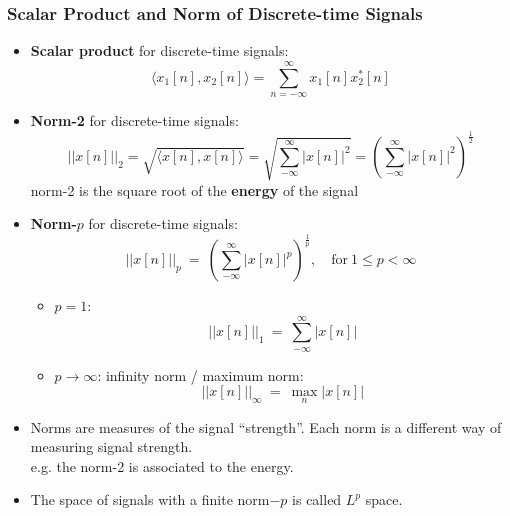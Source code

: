\documentclass[12pt,a4paper]{article}
\begin{document}
 \subsubsection{Scalar Product and Norm of Discrete-time Signals}
 \begin{itemize}
 \item \textbf{Scalar product} for discrete-time signals:
  \[ \langle x_{1}[n], x_{2}[n] \rangle = \sum_{n=-\infty}^{\infty} x_{1}[n] x_{2}^{*}[n] \]
 \item \textbf{Norm-2} for discrete-time signals:
  \[ \lvert \lvert x[n] \rvert \rvert_{2} = \sqrt{\langle x[n], x[n] \rangle} = \sqrt{\sum_{-\infty}^{\infty}\lvert
  x[n] \rvert^{2}} = \left( \sum_{-\infty}^{\infty} \lvert x[n] \rvert^{2} \right) ^{\frac{1}{2}} \]
  norm-2 is the square root of the \textbf{energy} of the signal
 \item \textbf{Norm-$p$} for discrete-time signals:
   \[ \lvert \lvert x[n] \rvert \rvert_{p} \ = \  \left( \sum_{-\infty}^{\infty} \lvert x[n] \rvert^{p} \right)
    ^{\frac{1}{p}}, \quad \text{for} \ 1 \leq p < \infty \]
    \begin{itemize}
     \item $p=1$: \[ \lvert \lvert x[n] \rvert \rvert_{1} \ = \ \sum_{-\infty}^{\infty} \lvert x[n] \rvert \]
     \item $p \to \infty$: infinity norm / maximum norm:\[ \lvert \lvert x[n] \rvert \rvert_{\infty} \ = \ 
      \max_{n} \lvert x[n] \rvert \] 
    \end{itemize}    
    \item Norms are measures of the signal “strength”. Each norm is a different way of measuring signal strength.\\
     e.g. the norm-2 is associated to the energy.
  \item The space of signals with a finite norm$-p$ is called $L^{p}$ space.
 \end{itemize}
 
 
\end{document}
